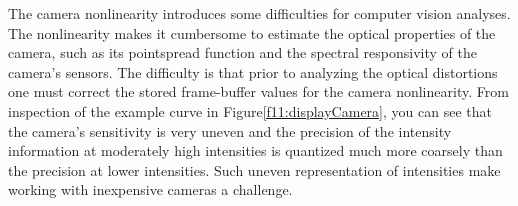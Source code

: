 The camera nonlinearity introduces some difficulties
for computer vision analyses.
The nonlinearity makes it
cumbersome to estimate the optical properties
of the camera, such as its pointspread function
and the spectral responsivity of the camera's sensors.
The difficulty is that
prior to analyzing the optical distortions
one must correct the stored frame-buffer values for
the camera nonlinearity.
From inspection of the example curve in Figure\ref{f11:displayCamera},
you can see that the camera's sensitivity is very uneven
and the precision of the intensity information
at moderately high intensities is quantized much
more coarsely than the precision at lower intensities.
Such uneven representation of intensities make working
with inexpensive cameras a challenge.

